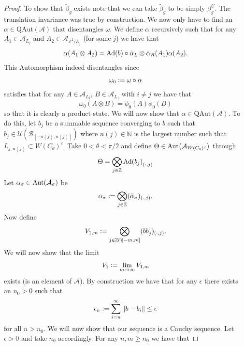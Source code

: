 \documentclass[12pt,a4paper,twoside]{article}
\newcommand{\defeq}{\vcentcolon=}
\let\originalleft\left
\let\originalright\right
\renewcommand{\left}{\mathopen{}\mathclose\bgroup\originalleft}
\renewcommand{\right}{\aftergroup\egroup\originalright}
\newcommand{\UU}{\mathcal U}
\newcommand{\BB}{\mathcal B}
\newcommand{\ZZ}{\mathbb Z}
\renewcommand{\AA}{\mathcal A}
\newcommand{\NN}{\mathbb{N}}
\newcommand{\Ad}[1]{\textrm{Ad}\left(#1\right)}
\newcommand{\Aut}[1]{\textrm{Aut}\left(#1\right)}
\theoremstyle{definition}
\numberwithin{equation}{section}
\begin{document}
\begin{proof}
	To show that $\tilde{\beta}_g$ exists note that we can take $\tilde{\beta}_g$ to be simply $\beta_g^{U}$. The translation invariance was true by construction. We now only have to find an $\alpha\in\textrm{QAut}(\AA)$ that disentangles $\omega$. We define $\alpha$ recursively such that for any $A_{1}\in\AA_{L_j}$ and $A_{2}\in\AA_{\ZZ^2/L_j}$ (for some $j$) we have that
	\begin{equation}
		\alpha(A_1\otimes A_2)=\Ad{b}\circ\tilde{\alpha}_L\otimes\tilde{\alpha}_R(A_1)\alpha(A_2).
	\end{equation}
	This Automorphism indeed disentangles since
	\begin{equation}
		\omega_0\defeq \omega\circ\alpha
	\end{equation}
	satisfies that for any $A\in\AA_{L_{i}}$, $B\in\AA_{L_{j}}$ with $i\neq j$ we have that
	\begin{equation}
		\omega_0(A\otimes B)=\phi_0(A)\phi_0(B)
	\end{equation}
	so that it is clearly a product state. We will now show that $\alpha\in\textrm{QAut}(\AA)$. To do this, let $b_j$ be a summable sequence converging to $b$ such that $b_j\in\UU(\BB_{[-n(j),n(j)]})$ where $n(j)\in\NN$ is the largest number such that $L_{j,n(j)}\subset W(C_\theta)^c$. Take $0<\theta<\pi/2$ and define $\Theta\in\Aut{\AA_{W(C_\theta)^c}}$ through
	\begin{equation}
		\Theta=\bigotimes_{j\in\ZZ}\Ad{b_j}_{(\cdot,j)}
	\end{equation}
	Let $\alpha_\sigma\in\Aut{\AA_\sigma}$ be
	\begin{equation}
		\alpha_\sigma\defeq \bigotimes_{j\in\ZZ}(\tilde\alpha_\sigma)_{(\cdot,j)}.
	\end{equation}
	Now define
	\begin{equation}
		V_{1,m}\defeq\bigotimes_{j\in\ZZ\cap[-m,m]}(bb_j^\dagger)_{(\cdot,j)}.
	\end{equation}
	We will now show that the limit
	\begin{equation}
		V_1\defeq\lim_{m\rightarrow\infty}V_{1,m}
	\end{equation}
	exists (is an element of $\AA$). By construction we have that for any $\epsilon$ there exists an $n_0>0$ such that
	\begin{equation}
		\epsilon_n\defeq\sum_{i=n}^\infty\norm{b-b_i}\leq\epsilon
	\end{equation}
	for all $n>n_0$. We will now show that our sequence is a Cauchy sequence. Let $\epsilon>0$ and take $n_0$ accordingly. For any $n,m\geq n_0$ we have that

\end{proof}
\end{document}
